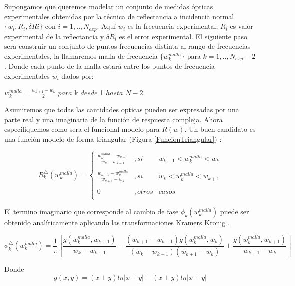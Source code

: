 \documentclass[a4paper,openright,12pt]{book}
\begin{document}
Supongamos que queremos modelar un conjunto de medidas ópticas experimentales obtenidas por la técnica de reflectancia a incidencia normal $\{w_{i}, R_{i},\delta R{i} \} $ con $i= 1,..,N_{exp}$. Aquí $w_{i}$ es la frecuencia experimental, $R_{i}$ es valor experimental de la reflectancia  y  $\delta R_{i}$ es el error experimental. El siguiente paso sera construir un conjunto de puntos frecuencias distinta al rango de frecuencias experimentales, la llamaremos malla de frecuencia $\{w_{k}^{malla}\}$ para $k=1,..,N_{exp}-2$ . Donde cada punto de la malla estará entre los puntos de frecuencia experimentales $w_{i}$ dados por: 
\begin{center}
$w_{k}^{malla}=\frac{w_{k+1}-w_{k}}{2}$  $para$ k $desde$ 1 $hasta$ $N-2.$
\end{center}
Asumiremos que todas las cantidades opticas pueden ser expresadas por una parte real y una imaginaria de la función de respuesta compleja. Ahora especifiquemos como sera el funcional modelo para $R(w)$.  Un buen candidato es una función modelo de forma triangular (Figura \ref{FuncionTriangular}) \cite{constrained}:


\begin{equation}
R_{k}^{\bigtriangleup}(w_{k}^{malla})=\left \{ \begin{array}{lcc}
\frac{w_{k}^{malla}-w_{k-1}}{w_{k}-w_{k-1}}&, si &w_{k-1}<w_{k}^{malla}<w_{k}\\
\\ \frac{w_{k+1}-w_{k}^{malla}}{w_{k+1}-w_{k}}&, si &w_{k}<w^{malla}_{k}<w_{k+1}\\
\\   0 &,  otros&casos\\
\end{array}
\right.
\end{equation}

El termino imaginario que corresponde al cambio de fase $\phi_{k}(w_{k}^{malla})$ puede ser obtenido analíticamente aplicando las transformaciones Kramers Kronig \cite{constrained}.

\begin{equation}
\phi_{k}^{\bigtriangleup}(w_{k}^{malla})=\frac{1}{\pi}[\frac{g(w_{k}^{malla},w_{k-1})}{w_{k}-w_{k-1}}-\frac{(w_{k+1}-w_{k-1})g(w^{malla}_{k},w_{k})}{(w_{k}-w_{k-1})(w_{k+1}-w_{k})}+\frac{g(w_{k}^{malla},w_{k+1})}{w_{k+1}-w_{k}}]
\end{equation}

Donde \\

\begin{equation}
g(x,y)=(x+y)ln\left |x+y\right | +(x+y)ln\left |x+y\right |
\end{equation}
\end{document}
